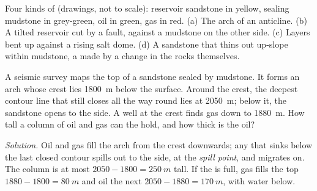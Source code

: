\begin{omfigure}

{\small Four kinds of  (drawings, not to scale): reservoir sandstone in
yellow, sealing mudstone in grey-green, oil in green, gas in red. (a) The
arch of an anticline. (b) A tilted reservoir cut by a fault, against a
mudstone on the other side. (c) Layers bent up against a rising salt dome.
(d) A sandstone that thins out up-slope within mudstone, a  made by a
change in the rocks themselves.}
\end{omfigure}

\begin{example}\label{ex:g11:fossil-fuel-geology:anticline}
A seismic survey maps the top of a sandstone sealed by mudstone. It forms an
arch whose crest lies \qty{1800}{m} below the surface. Around the crest, the
deepest contour line that still closes all the way round lies at
\qty{2050}{m}; below it, the sandstone opens to the side. A well at the crest
finds gas down to \qty{1880}{m}. How tall a column of oil and gas can the
 hold, and how thick is the oil?

\emph{Solution.} Oil and gas fill the arch from the crest downwards; any
that sinks below the last closed contour spills out to the side, at the
\emph{spill point}, and migrates on. The column is at most
$2050 - 1800 = \qty{250}{m}$ tall. If the  is full, gas fills the top
$1880 - 1800 = \qty{80}{m}$ and oil the next $2050 - 1880 = \qty{170}{m}$,
with water below.
\end{example}

